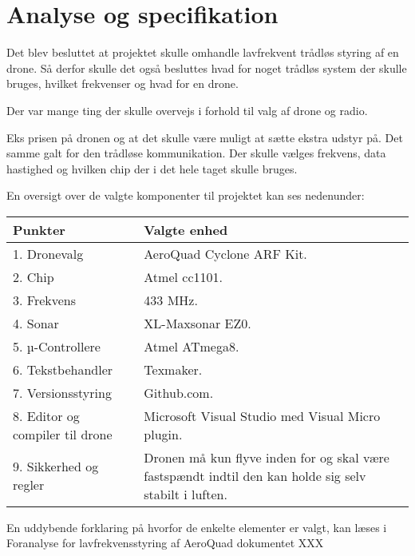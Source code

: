 \documentclass[Main]{subfiles}
\begin{document}
\section{Analyse og specifikation}
Det blev besluttet at projektet skulle omhandle lavfrekvent trådløs styring af en drone. Så derfor skulle det også besluttes hvad for noget trådløs system der skulle bruges, hvilket frekvenser og hvad for en drone.

Der var mange ting der skulle overvejs i forhold til valg af drone og radio.

Eks prisen på dronen og at det skulle være muligt at sætte ekstra udstyr på.
Det samme galt for den trådløse kommunikation. Der skulle vælges frekvens, data hastighed og hvilken chip der i det hele taget skulle bruges.

En oversigt over de valgte komponenter til projektet kan ses nedenunder:

\begin{tabular}{p{} p{}}
\hline
Punkter & Valgte enhed \\ \hline
1. Dronevalg & AeroQuad Cyclone ARF Kit. \\
2. Chip & Atmel cc1101.\\
3. Frekvens & 433 MHz.\\
4. Sonar & XL-Maxsonar EZ0.\\
5. µ-Controllere & Atmel ATmega8.\\
6. Tekstbehandler & Texmaker.\\
7. Versionsstyring & Github.com.\\
8. Editor og compiler til drone & Microsoft Visual Studio med Visual Micro plugin.\\
9. Sikkerhed og regler & Dronen må kun flyve inden for og skal være fastspændt indtil den kan holde sig selv stabilt i luften.\\ \hline
\end{tabular}

En uddybende forklaring på hvorfor de enkelte elementer er valgt, kan læses i 
Foranalyse for lavfrekvensstyring af AeroQuad dokumentet XXX
\end{document}
